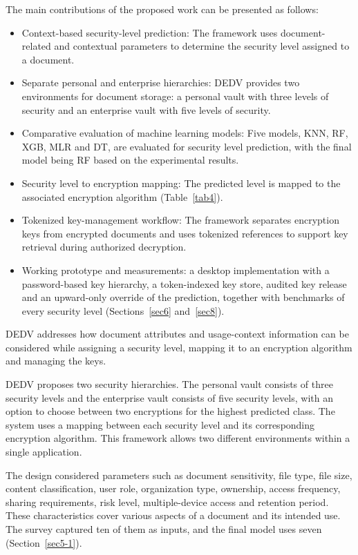 \documentclass[pdflatex,sn-mathphys-num]{sn-jnl}
\begin{document}
The main contributions of the proposed work can be presented as follows:
\begin{itemize}
\item Context-based security-level prediction: The framework uses document-related and contextual
parameters to determine the security level assigned to a document.
\item Separate personal and enterprise hierarchies: DEDV provides two environments for document
storage: a personal vault with three levels of security and an enterprise vault with five levels
of security.
\item Comparative evaluation of machine learning models: Five models, KNN, RF, XGB, MLR and DT, are
evaluated for security level prediction, with the final model being RF based on the experimental
results.
\item Security level to encryption mapping: The predicted level is mapped to the associated
encryption algorithm (Table~\ref{tab4}).
\item Tokenized key-management workflow: The framework separates encryption keys from encrypted
documents and uses tokenized references to support key retrieval during authorized decryption.
\item Working prototype and measurements: a desktop implementation with a password-based key
hierarchy, a token-indexed key store, audited key release and an upward-only override of the
prediction, together with benchmarks of every security level (Sections~\ref{sec6}
and~\ref{sec8}).
\end{itemize}

DEDV addresses how document attributes and usage-context information can be considered while
assigning a security level, mapping it to an encryption algorithm and managing the keys.

DEDV proposes two security hierarchies. The personal vault consists of three security levels and
the enterprise vault consists of five security levels, with an option to choose between two
encryptions for the highest predicted class. The system uses a mapping between each security level
and its corresponding encryption algorithm. This framework allows two different environments
within a single application.

The design considered parameters such as document sensitivity, file type, file size, content
classification, user role, organization type, ownership, access frequency, sharing requirements,
risk level, multiple-device access and retention period. These characteristics cover various
aspects of a document and its intended use. The survey captured ten of them as inputs, and the
final model uses seven (Section~\ref{sec5-1}).
\end{document}
